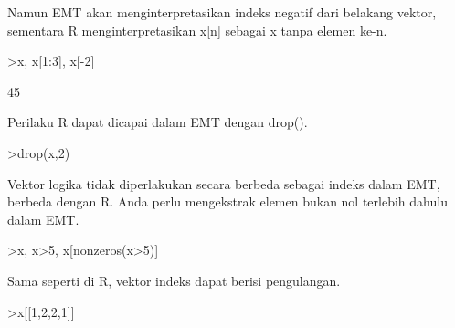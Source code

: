 \documentclass[a4paper,10pt]{article}
\begin{document}
\begin{eulernotebook}
\begin{eulercomment}
\begin{eulercomment}
\begin{eulercomment}
\begin{eulercomment}
\begin{eulercomment}
\begin{eulercomment}
\begin{eulercomment}
\begin{eulercomment}
\begin{eulercomment}
\begin{eulercomment}
\begin{eulercomment}
\begin{eulercomment}
\begin{eulercomment}
\begin{eulercomment}
\begin{eulercomment}
\begin{eulercomment}
\begin{eulercomment}
\begin{eulercomment}
\begin{eulercomment}
\begin{eulercomment}
\begin{eulercomment}
\begin{eulercomment}
\begin{eulercomment}
\begin{eulercomment}
\begin{eulercomment}
\begin{eulercomment}
\begin{eulercomment}
\begin{eulercomment}
\begin{eulercomment}
\begin{eulercomment}
\begin{eulercomment}
\begin{eulercomment}
\begin{eulercomment}
\begin{eulercomment}
\begin{eulercomment}
Namun EMT akan menginterpretasikan indeks negatif dari belakang
vektor, sementara R menginterpretasikan x[n] sebagai x tanpa elemen
ke-n.
\end{eulercomment}
\begin{eulerprompt}
>x, x[1:3], x[-2]
\end{eulerprompt}
\begin{euleroutput}
  [-55,  -45,  -35,  -25,  -15,  -5,  5,  15,  25,  35,  45,  55]
  [-55,  -45,  -35]
  45
\end{euleroutput}
\begin{eulercomment}
Perilaku R dapat dicapai dalam EMT dengan drop().
\end{eulercomment}
\begin{eulerprompt}
>drop(x,2)
\end{eulerprompt}
\begin{euleroutput}
  [-55,  -35,  -25,  -15,  -5,  5,  15,  25,  35,  45,  55]
\end{euleroutput}
\begin{eulercomment}
Vektor logika tidak diperlakukan secara berbeda sebagai indeks dalam
EMT, berbeda dengan R. Anda perlu mengekstrak elemen bukan nol
terlebih dahulu dalam EMT.
\end{eulercomment}
\begin{eulerprompt}
>x, x>5, x[nonzeros(x>5)]
\end{eulerprompt}
\begin{euleroutput}
  [-55,  -45,  -35,  -25,  -15,  -5,  5,  15,  25,  35,  45,  55]
  [0,  0,  0,  0,  0,  0,  0,  1,  1,  1,  1,  1]
  [15,  25,  35,  45,  55]
\end{euleroutput}
\begin{eulercomment}
Sama seperti di R, vektor indeks dapat berisi pengulangan.
\end{eulercomment}
\begin{eulerprompt}
>x[[1,2,2,1]]

\end{eulerprompt}
\end{eulercomment}
\end{eulercomment}
\end{eulercomment}
\end{eulercomment}
\end{eulercomment}
\end{eulercomment}
\end{eulercomment}
\end{eulercomment}
\end{eulercomment}
\end{eulercomment}
\end{eulercomment}
\end{eulercomment}
\end{eulercomment}
\end{eulercomment}
\end{eulercomment}
\end{eulercomment}
\end{eulercomment}
\end{eulercomment}
\end{eulercomment}
\end{eulercomment}
\end{eulercomment}
\end{eulercomment}
\end{eulercomment}
\end{eulercomment}
\end{eulercomment}
\end{eulercomment}
\end{eulercomment}
\end{eulercomment}
\end{eulercomment}
\end{eulercomment}
\end{eulercomment}
\end{eulercomment}
\end{eulercomment}
\end{eulercomment}
\end{eulernotebook}
\end{document}
